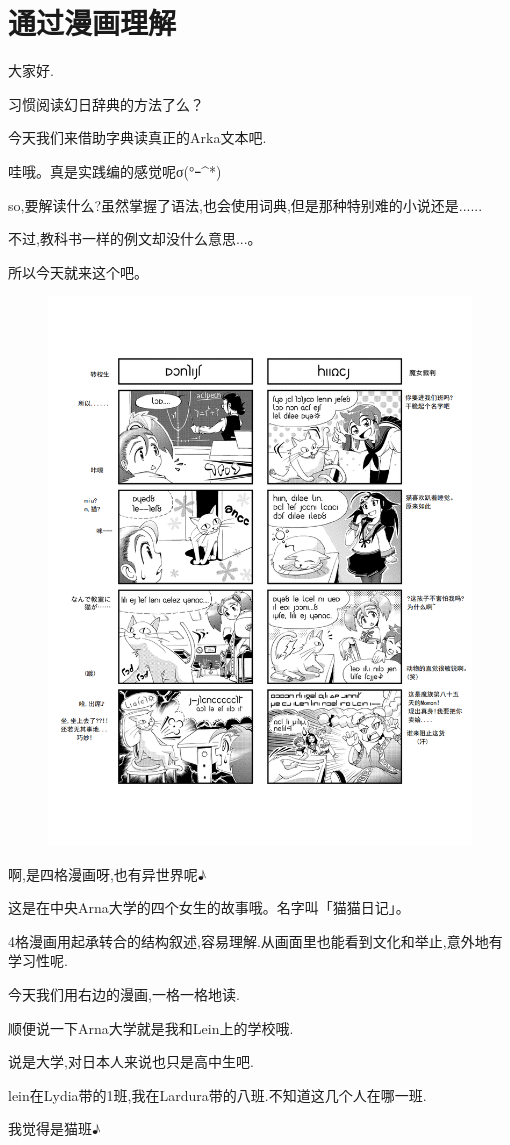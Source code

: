 \chapter{通过漫画理解}

大家好.

习惯阅读幻日辞典的方法了么？

今天我们来借助字典读真正的Arka文本吧.


哇哦。真是实践编的感觉呢σ(°ｰ\^{}*)

so,要解读什么?虽然掌握了语法,也会使用词典,但是那种特别难的小说还是......

不过,教科书一样的例文却没什么意思...。


所以今天就来这个吧。
\begin{figure}[H]
\includegraphics[width=\textwidth]{pngs/xarl2.png}%
\end{figure}



啊,是四格漫画呀,也有异世界呢♪



这是在中央Arna大学的四个女生的故事哦。名字叫「猫猫日记」。

4格漫画用起承转合的结构叙述,容易理解.从画面里也能看到文化和举止,意外地有学习性呢.

今天我们用右边的漫画,一格一格地读.

顺便说一下Arna大学就是我和Lein上的学校哦.

说是大学,对日本人来说也只是高中生吧.

lein在Lydia带的1班,我在Lardura带的八班.不知道这几个人在哪一班.


我觉得是猫班♪
